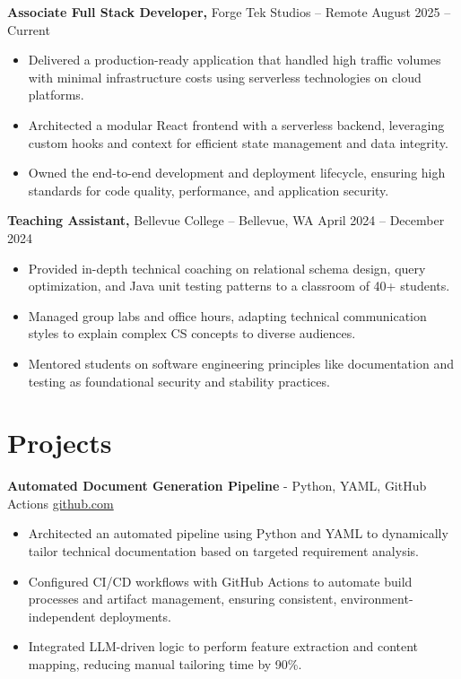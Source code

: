 \documentclass[11pt]{article}       %
\begin{document}
\textbf{Associate Full Stack Developer,} {Forge Tek Studios} -- Remote \hfill August 2025 -- Current 
\vspace{-9pt}
\begin{itemize}
  \item Delivered a production-ready application that handled high traffic volumes with minimal infrastructure costs using serverless technologies on cloud platforms.
  \item Architected a modular React frontend with a serverless backend, leveraging custom hooks and context for efficient state management and data integrity.
  \item Owned the end-to-end development and deployment lifecycle, ensuring high standards for code quality, performance, and application security.
\end{itemize}

\textbf{Teaching Assistant,} {Bellevue College} -- Bellevue, WA \hfill April 2024 -- December 2024 \\
\vspace{-9pt}
\begin{itemize}
  \item Provided in-depth technical coaching on relational schema design, query optimization, and Java unit testing patterns to a classroom of 40+ students.
  \item Managed group labs and office hours, adapting technical communication styles to explain complex CS concepts to diverse audiences.
  \item Mentored students on software engineering principles like documentation and testing as foundational security and stability practices.
\end{itemize}

\vspace{-18.5pt}

\section*{Projects}

\textbf{Automated Document Generation Pipeline}{ - Python, YAML, GitHub Actions} \hfill \href{https://github.com/Monica20030707/Tex_OrangeLeaf-mcp}{github.com} \\
\vspace{-9pt}
\begin{itemize}
  \item Architected an automated pipeline using Python and YAML to dynamically tailor technical documentation based on targeted requirement analysis.
  \item Configured CI/CD workflows with GitHub Actions to automate build processes and artifact management, ensuring consistent, environment-independent deployments.
  \item Integrated LLM-driven logic to perform feature extraction and content mapping, reducing manual tailoring time by 90\%.
\end{itemize}
\end{document}

